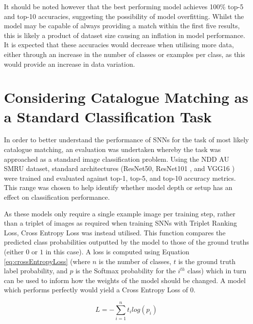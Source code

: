 It should be noted however that the best performing model achieves 100\% top-5 and top-10 accuracies, suggesting the possibility of model overfitting. Whilst the model may be capable of always providing a match within the first five results, this is likely a product of dataset size causing an inflation in model performance. It is expected that these accuracies would decrease when utilising more data, either through an increase in the number of classes or examples per class, as this would provide an increase in data variation.

\section{Considering Catalogue Matching as a Standard Classification Task}\label{ch:SNNEvaluation,sec:comparsion}

In order to better understand the performance of SNNs for the task of most likely catalogue matching, an evaluation was undertaken whereby the task was approached as a standard image classification problem. Using the NDD AU SMRU dataset, standard architectures (ResNet50, ResNet101 \cite{he_deep_2015}, and VGG16 \cite{simonyan_very_2015}) were trained and evaluated against top-1, top-5, and top-10 accuracy metrics. This range was chosen to help identify whether model depth or setup has an effect on classification performance. 

As these models only require a single example image per training step, rather than a triplet of images as required when training SNNs with Triplet Ranking Loss, Cross Entropy Loss was instead utilised. This function compares the predicted class probabilities outputted by the model to those of the ground truths (either $0$ or $1$ in this case). A loss is computed using Equation \ref{eq:crossEntropyLoss} (where $n$ is the number of classes, $t$ is the ground truth label probability, and $p$ is the Softmax probability for the $i^{th}$ class) which in turn can be used to inform how the weights of the model should be changed. A model which performs perfectly would yield a Cross Entropy Loss of 0. 

\begin{equation}
	\label{eq:crossEntropyLoss}
	L = -\sum_{i=1}^{n} t_{i} log(p_{i})
\end{equation}

